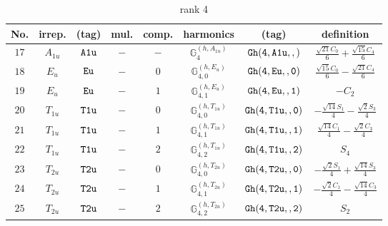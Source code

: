 \documentclass[fleqn,8pt]{jsarticle}
\begin{document}
\begin{table}[ht!]
\begin{center}
\caption{rank 4}
\renewcommand{\arraystretch}{1.3}
\begin{tabular}{cccccccc} \hline \hline
No. & irrep. & (tag) & mul. & comp. & harmonics & (tag) & definition \\ \hline
$ 17 $ & $ A_{1u} $ & $ {\tt A1u} $ & $ - $ & $ - $ & $ \mathbb{G}_{4}^{(h,A_{1u})} $ & $ {\tt Gh(4,A1u,,)} $ & $ \frac{\sqrt{21} C_{0}}{6} + \frac{\sqrt{15} C_{4}}{6} $ \\
$ 18 $ & $ E_{u} $ & $ {\tt Eu} $ & $ - $ & $ 0 $ & $ \mathbb{G}_{4,0}^{(h,E_{u})} $ & $ {\tt Gh(4,Eu,,0)} $ & $ \frac{\sqrt{15} C_{0}}{6} - \frac{\sqrt{21} C_{4}}{6} $ \\
$ 19 $ & $ E_{u} $ & $ {\tt Eu} $ & $ - $ & $ 1 $ & $ \mathbb{G}_{4,1}^{(h,E_{u})} $ & $ {\tt Gh(4,Eu,,1)} $ & $ - C_{2} $ \\
$ 20 $ & $ T_{1u} $ & $ {\tt T1u} $ & $ - $ & $ 0 $ & $ \mathbb{G}_{4,0}^{(h,T_{1u})} $ & $ {\tt Gh(4,T1u,,0)} $ & $ - \frac{\sqrt{14} S_{1}}{4} - \frac{\sqrt{2} S_{3}}{4} $ \\
$ 21 $ & $ T_{1u} $ & $ {\tt T1u} $ & $ - $ & $ 1 $ & $ \mathbb{G}_{4,1}^{(h,T_{1u})} $ & $ {\tt Gh(4,T1u,,1)} $ & $ \frac{\sqrt{14} C_{1}}{4} - \frac{\sqrt{2} C_{3}}{4} $ \\
$ 22 $ & $ T_{1u} $ & $ {\tt T1u} $ & $ - $ & $ 2 $ & $ \mathbb{G}_{4,2}^{(h,T_{1u})} $ & $ {\tt Gh(4,T1u,,2)} $ & $ S_{4} $ \\
$ 23 $ & $ T_{2u} $ & $ {\tt T2u} $ & $ - $ & $ 0 $ & $ \mathbb{G}_{4,0}^{(h,T_{2u})} $ & $ {\tt Gh(4,T2u,,0)} $ & $ - \frac{\sqrt{2} S_{1}}{4} + \frac{\sqrt{14} S_{3}}{4} $ \\
$ 24 $ & $ T_{2u} $ & $ {\tt T2u} $ & $ - $ & $ 1 $ & $ \mathbb{G}_{4,1}^{(h,T_{2u})} $ & $ {\tt Gh(4,T2u,,1)} $ & $ - \frac{\sqrt{2} C_{1}}{4} - \frac{\sqrt{14} C_{3}}{4} $ \\
$ 25 $ & $ T_{2u} $ & $ {\tt T2u} $ & $ - $ & $ 2 $ & $ \mathbb{G}_{4,2}^{(h,T_{2u})} $ & $ {\tt Gh(4,T2u,,2)} $ & $ S_{2} $ \\
 \hline \hline
\end{tabular}
\end{center}
\end{table}
\end{document}
